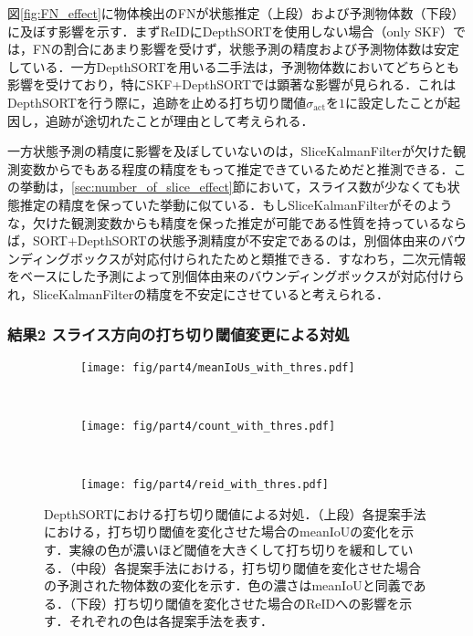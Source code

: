         図\ref{fig:FN_effect}に物体検出のFNが状態推定（上段）および予測物体数（下段）に及ぼす影響を示す．まずReIDにDepthSORTを使用しない場合（only SKF）では，FNの割合にあまり影響を受けず，状態予測の精度および予測物体数は安定している．一方DepthSORTを用いる二手法は，予測物体数においてどちらとも影響を受けており，特にSKF+DepthSORTでは顕著な影響が見られる．これはDepthSORTを行う際に，追跡を止める打ち切り閾値$\sigma_{\text{act}}$を$1$に設定したことが起因し，追跡が途切れたことが理由として考えられる．

        一方状態予測の精度に影響を及ぼしていないのは，SliceKalmanFilterが欠けた観測変数からでもある程度の精度をもって推定できているためだと推測できる．この挙動は，\ref{sec:number_of_slice_effect}節において，スライス数が少なくても状態推定の精度を保っていた挙動に似ている．もしSliceKalmanFilterがそのような，欠けた観測変数からも精度を保った推定が可能である性質を持っているならば，SORT+DepthSORTの状態予測精度が不安定であるのは，別個体由来のバウンディングボックスが対応付けられたためと類推できる．すなわち，二次元情報をベースにした予測によって別個体由来のバウンディングボックスが対応付けられ，SliceKalmanFilterの精度を不安定にさせていると考えられる．

        \subsubsection{結果2 スライス方向の打ち切り閾値変更による対処}

        \begin{figure}[t]
            \begin{subfigure}[t]{\linewidth}
                \centering
                \texttt{[image: fig/part4/meanIoUs\_with\_thres.pdf]}
            \end{subfigure}
            \\
            \begin{subfigure}[t]{\linewidth}
                \centering
                \texttt{[image: fig/part4/count\_with\_thres.pdf]}
            \end{subfigure}
            \\
            \begin{subfigure}[t]{\linewidth}
                \centering
                \texttt{[image: fig/part4/reid\_with\_thres.pdf]}
            \end{subfigure}
            \caption[DepthSORTにおける打ち切り閾値による対処]{DepthSORTにおける打ち切り閾値による対処．（上段）各提案手法における，打ち切り閾値を変化させた場合のmeanIoUの変化を示す．実線の色が濃いほど閾値を大きくして打ち切りを緩和している．（中段）各提案手法における，打ち切り閾値を変化させた場合の予測された物体数の変化を示す．色の濃さはmeanIoUと同義である．（下段）打ち切り閾値を変化させた場合のReIDへの影響を示す．それぞれの色は各提案手法を表す．}
            \label{fig:handling_with_thres}
        \end{figure}

